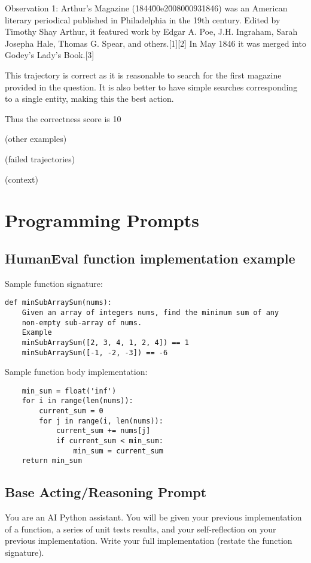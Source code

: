 \documentclass{article} \usepackage{iclr2024_conference,times}
\begin{document}
Observation 1: Arthur's Magazine (1844\u00e2\u0080\u00931846) was an American literary periodical published in Philadelphia in the 19th century. Edited by Timothy Shay Arthur, it featured work by Edgar A. Poe, J.H. Ingraham, Sarah Josepha Hale, Thomas G. Spear, and others.[1][2] In May 1846 it was merged into Godey's Lady's Book.[3]

This trajectory is correct as it is reasonable to search for the first magazine provided in the question. It is also better to have simple searches corresponding to a single entity, making this the best action.

Thus the correctness score is 10

(other examples)

(failed trajectories)

(context)

\section{Programming Prompts}
\label{sec:programming_prompt}
\subsection{HumanEval function implementation example}
Sample function signature:\\
\begin{lstlisting}
def minSubArraySum(nums):
    Given an array of integers nums, find the minimum sum of any
    non-empty sub-array of nums.
    Example
    minSubArraySum([2, 3, 4, 1, 2, 4]) == 1
    minSubArraySum([-1, -2, -3]) == -6
\end{lstlisting}

Sample function body implementation:\\
\begin{lstlisting}
    min_sum = float('inf')
    for i in range(len(nums)):
        current_sum = 0
        for j in range(i, len(nums)):
            current_sum += nums[j]
            if current_sum < min_sum:
                min_sum = current_sum
    return min_sum
\end{lstlisting}

\subsection{Base Acting/Reasoning Prompt}

You are an AI Python assistant. You will be given your previous implementation of a function, a series of unit tests results, and your self-reflection on your previous implementation. Write your full implementation (restate the function signature).
\end{document}
